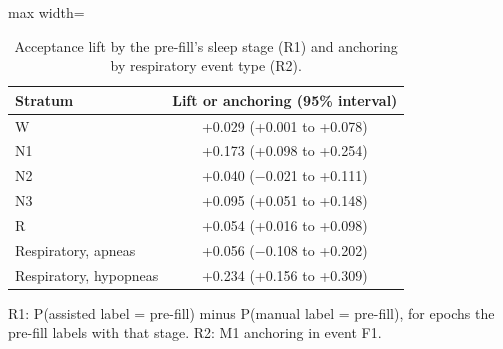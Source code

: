 \begin{table}[h!]
\centering
\footnotesize
\caption{Acceptance lift by the pre-fill's sleep stage (R1) and anchoring by respiratory event type (R2).}
\label{tab:s-r1r2}
\begin{adjustbox}{max width=\linewidth}
\begin{tabular}{lc}
\toprule
Stratum & Lift or anchoring (95\% interval) \\
\midrule
W & +0.029 (+0.001 to +0.078) \\
N1 & +0.173 (+0.098 to +0.254) \\
N2 & +0.040 (\ensuremath{-}0.021 to +0.111) \\
N3 & +0.095 (+0.051 to +0.148) \\
R & +0.054 (+0.016 to +0.098) \\
Respiratory, apneas & +0.056 (\ensuremath{-}0.108 to +0.202) \\
Respiratory, hypopneas & +0.234 (+0.156 to +0.309) \\
\bottomrule
\end{tabular}
\end{adjustbox}
\par\smallskip
\begin{minipage}{0.95\linewidth}\footnotesize R1: P(assisted label = pre-fill) minus P(manual label = pre-fill), for epochs the pre-fill labels with that stage. R2: M1 anchoring in event F1.\end{minipage}
\end{table}
